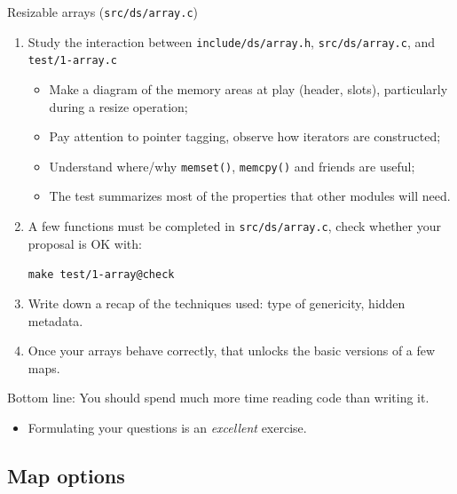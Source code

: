 \begin{frame}[fragile]{Resizable arrays (\texttt{src/ds/array.c})}

  \begin{enumerate}
  \item Study the interaction between \lstinline{include/ds/array.h}, \lstinline{src/ds/array.c}, and \lstinline{test/1-array.c}
    \begin{itemize}
    \item Make a diagram of the memory areas at play (header, slots), particularly during a resize operation;
    \item Pay attention to pointer tagging, observe how iterators are constructed;
    \item Understand where/why \lstinline{memset()}, \lstinline{memcpy()} and friends are useful; 
    \item The test summarizes most of the properties that other modules will need.
    \end{itemize}
  \item A few functions must be completed in \lstinline{src/ds/array.c}, check whether your proposal is OK with:

    \lstinline{make test/1-array@check}

  \item Write down a recap of the techniques used: type of genericity, hidden metadata.

  \item Once your arrays behave correctly, that unlocks the basic versions of a few maps.
  \end{enumerate}

  Bottom line: You should spend much more time reading code than writing it.
  \begin{itemize}
  \item Formulating your questions is an {\em excellent} exercise.
  \end{itemize}

\end{frame}


\subsection{Map options}

